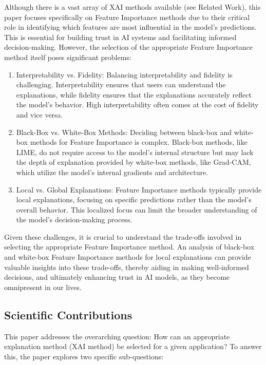 \documentclass{article}
\begin{document}
Although there is a vast array of XAI methods available (see Related Work), this paper focuses specifically on Feature Importance methods due to their critical role in identifying which features are most influential in the model’s predictions. This is essential for building trust in AI systems and facilitating informed decision-making. However, the selection of the appropriate Feature Importance method itself poses significant problems:

\begin{enumerate}
    \item Interpretability vs. Fidelity:
    Balancing interpretability and fidelity is challenging. Interpretability ensures that users can understand the explanations, while fidelity ensures that the explanations accurately reflect the model’s behavior. High interpretability often comes at the cost of fidelity and vice versa.
    \item Black-Box vs. White-Box Methods:
    Deciding between black-box and white-box methods for Feature Importance is complex. Black-box methods, like LIME, do not require access to the model’s internal structure but may lack the depth of explanation provided by white-box methods, like Grad-CAM, which utilize the model’s internal gradients and architecture.
    \item Local vs. Global Explanations:
    Feature Importance methods typically provide local explanations, focusing on specific predictions rather than the model’s overall behavior. This localized focus can limit the broader understanding of the model’s decision-making process.
\end{enumerate}

Given these challenges, it is crucial to understand the trade-offs involved in selecting the appropriate Feature Importance method. An analysis of black-box and white-box Feature Importance methods for local explanations can provide valuable insights into these trade-offs, thereby aiding in making well-informed decisions, and ultimately enhancing trust in AI models, as they become omnipresent in our lives.



\subsection{Scientific Contributions}
This paper addresses the overarching question: How can an appropriate explanation method (XAI method) be selected for a given application? To answer this, the paper explores two specific sub-questions:
\end{document}
